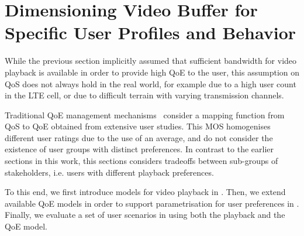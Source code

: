 \section{Dimensioning Video Buffer for Specific User Profiles and Behavior}\label{sec:application:qoe_user_behaviour}

\newcommand{\stallingRatio}{\ensuremath{R}\xspace}
\newcommand{\stallingDuration}{\ensuremath{L}\xspace}
\newcommand{\numberStallingEvents}{\ensuremath{N^*}\xspace}
\newcommand{\stallingFrequency}{\ensuremath{F}\xspace}
\newcommand{\meanStallingEventDuration}{\ensuremath{L}\xspace}

\newcommand{\networkBandwidth}{\ensuremath{\lambda}\xspace}
\newcommand{\playbackRate}{\ensuremath{\mu}\xspace}

\newcommand{\meanBusy}{\ensuremath{B}\xspace}
\newcommand{\meanIdle}{\ensuremath{L}\xspace}
\newcommand{\numberFrames}{\ensuremath{Z}\xspace}
\newcommand{\videoDownloadTime}{\ensuremath{t_Z}\xspace}

\newcommand{\watchLater}{\emph{Watch Later}\xspace}
\newcommand{\watchNow}{\emph{Watch Now}\xspace}
\newcommand{\videoBrowsing}{\emph{Video Browsing}\xspace}

While the previous section implicitly assumed that sufficient bandwidth for video playback is available in order to provide high \gls{QoE} to the user, this assumption on \gls{QoS} does not always hold in the real world, for example due to a high user count in the \gls{LTE} cell, or due to difficult terrain with varying transmission channels.

Traditional \gls{QoE} management mechanisms~\cite{Hossfeld2013c} consider a mapping function from \gls{QoS} to \gls{QoE} obtained from extensive user studies.
This \gls{MOS} homogenises different user ratings due to the use of an average, and do not consider the existence of user groups with distinct preferences.
In contrast to the earlier sections in this work, this sections considers tradeoffs between sub-groups of stakeholders, i.e. users with different playback preferences.

To this end, we first introduce models for video playback in .
Then, we extend available \gls{QoE} models in order to support parametrisation for user preferences in .
Finally, we evaluate a set of user scenarios in  using both the playback and the \gls{QoE} model.



